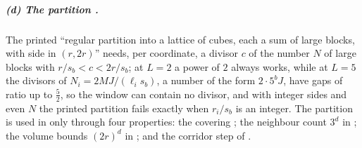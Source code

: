 \subparagraph{(d) The partition \cite[(3.43)--(3.45)]{Ba2}.} The printed ``regular partition into a lattice of cubes, each a sum of large blocks, with side in $(r,2r)$'' needs, per coordinate, a divisor $c$ of the number $N$ of large blocks with $r/s_b<c<2r/s_b$; at $L=2$ a power of $2$ always works, while at $L=5$ the divisors of $N_i=2MJ/(\ell_is_b)$, a number of the form $2\cdot5^{b}J$, have gaps of ratio up to $\frac52$, so the window can contain no divisor, and with integer sides and even $N$ the printed partition fails exactly when $r_i/s_b$ is an integer. The partition is used in \cite[Sect.~3C]{Ba2} only through four properties: the covering \cite[(3.43)]{Ba2}; the neighbour count $3^d$ in \cite[(3.44)--(3.45)]{Ba2}; the volume bounds $(2r)^d$ in \cite[(3.48)--(3.49)]{Ba2}; and the corridor step of \cite[p.~593]{Ba2}.


